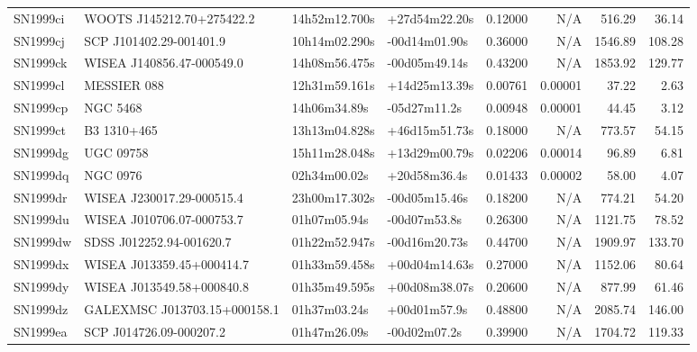 \begin{longtable}{llllrrrr}
SN1999ci         &       WOOTS J145212.70+275422.2 &   14h52m12.700s &   +27d54m22.20s &  0.12000 &      N/A &   516.29 &       36.14 \\
SN1999cj         &         SCP J101402.29-001401.9 &   10h14m02.290s &   -00d14m01.90s &  0.36000 &      N/A &  1546.89 &      108.28 \\
SN1999ck         &       WISEA J140856.47-000549.0 &   14h08m56.475s &   -00d05m49.14s &  0.43200 &      N/A &  1853.92 &      129.77 \\
SN1999cl         &                     MESSIER 088 &   12h31m59.161s &   +14d25m13.39s &  0.00761 &  0.00001 &    37.22 &        2.63 \\
SN1999cp         &                        NGC 5468 &    14h06m34.89s &    -05d27m11.2s &  0.00948 &  0.00001 &    44.45 &        3.12 \\
SN1999ct         &                     B3 1310+465 &   13h13m04.828s &   +46d15m51.73s &  0.18000 &      N/A &   773.57 &       54.15 \\
SN1999dg         &                       UGC 09758 &   15h11m28.048s &   +13d29m00.79s &  0.02206 &  0.00014 &    96.89 &        6.81 \\
SN1999dq         &                        NGC 0976 &    02h34m00.02s &    +20d58m36.4s &  0.01433 &  0.00002 &    58.00 &        4.07 \\
SN1999dr         &       WISEA J230017.29-000515.4 &   23h00m17.302s &   -00d05m15.46s &  0.18200 &      N/A &   774.21 &       54.20 \\
SN1999du         &       WISEA J010706.07-000753.7 &    01h07m05.94s &    -00d07m53.8s &  0.26300 &      N/A &  1121.75 &       78.52 \\
SN1999dw         &        SDSS J012252.94-001620.7 &   01h22m52.947s &   -00d16m20.73s &  0.44700 &      N/A &  1909.97 &      133.70 \\
SN1999dx         &       WISEA J013359.45+000414.7 &   01h33m59.458s &   +00d04m14.63s &  0.27000 &      N/A &  1152.06 &       80.64 \\
SN1999dy         &       WISEA J013549.58+000840.8 &   01h35m49.595s &   +00d08m38.07s &  0.20600 &      N/A &   877.99 &       61.46 \\
SN1999dz         &  GALEXMSC J013703.15+000158.1   &    01h37m03.24s &    +00d01m57.9s &  0.48800 &      N/A &  2085.74 &      146.00 \\
SN1999ea         &         SCP J014726.09-000207.2 &    01h47m26.09s &    -00d02m07.2s &  0.39900 &      N/A &  1704.72 &      119.33 \\

\end{longtable}
